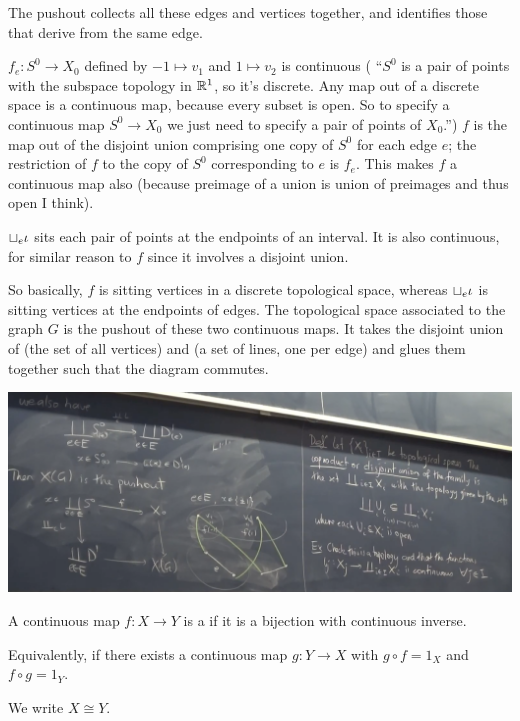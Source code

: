 \begin{example}
The pushout collects all these edges and vertices together, and identifies those that derive from
the same edge.

$f_e: S^0 \to X_0$ defined by $-1 \mapsto v_1$ and $1 \mapsto v_2$ is continuous ( ``$S^0$ is a pair
of points with the subspace topology in $\mathbb{R}^1$​, so it's discrete. Any map out of a discrete space
is a continuous map, because every subset is open. So to specify a continuous map $S^0 \to X_0$ we
just need to specify a pair of points of $X_0$.'') $f$ is the map out of the disjoint union
comprising one copy of $S^0$ for each edge $e$; the restriction of $f$ to the copy of $S^0$
corresponding to $e$ is $f_e$. This makes $f$ a continuous map also (because preimage of a union is
union of preimages and thus open I think).

$\sqcup_e \iota$ sits each pair of points at the endpoints of an interval. It is also
continuous, for similar reason to $f$ since it involves a disjoint union.

So basically, $f$ is sitting vertices in a discrete topological space, whereas $\sqcup_e \iota$
is sitting vertices at the endpoints of edges. The topological space associated to the graph $G$ is
the pushout of these two continuous maps. It takes the disjoint union of (the set of all vertices)
and (a set of lines, one per edge) and glues them together such that the diagram commutes.

\begin{mdframed}
\includegraphics[width=400pt]{img/analysis--berkeley-202a-topology-54da.png}
\end{mdframed}
\end{example}


\begin{definition}[homeomorphism]
  A continuous map $f:X \to Y$ is a  if it is a bijection with continuous inverse.

  Equivalently, if there exists a continuous map $g:Y \to X$ with $g \circ f = 1_X$ and $f \circ g = 1_Y$.

  We write $X \cong Y$.
\end{definition}

